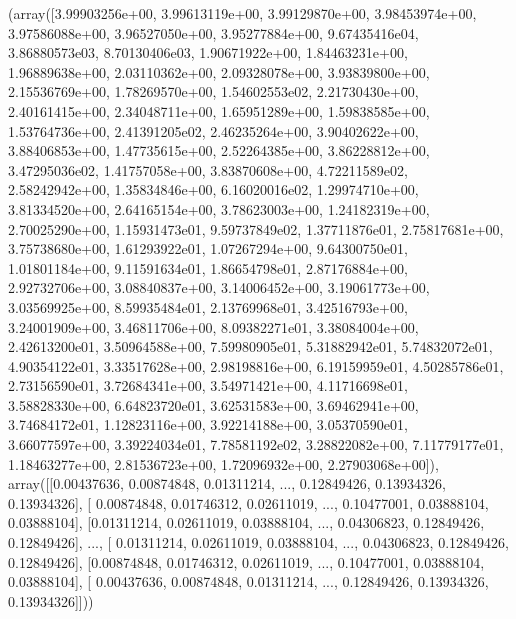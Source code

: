 \documentclass[letterpaper,10pt,english]{jupyterBook}
\begin{document}
\begin{sphinxVerbatim}[commandchars=\\\{\}]
(array([3.99903256e+00, 3.99613119e+00, 3.99129870e+00, 3.98453974e+00,
        3.97586088e+00, 3.96527050e+00, 3.95277884e+00, 9.67435416e\PYGZhy{}04,
        3.86880573e\PYGZhy{}03, 8.70130406e\PYGZhy{}03, 1.90671922e+00, 1.84463231e+00,
        1.96889638e+00, 2.03110362e+00, 2.09328078e+00, 3.93839800e+00,
        2.15536769e+00, 1.78269570e+00, 1.54602553e\PYGZhy{}02, 2.21730430e+00,
        2.40161415e+00, 2.34048711e+00, 1.65951289e+00, 1.59838585e+00,
        1.53764736e+00, 2.41391205e\PYGZhy{}02, 2.46235264e+00, 3.90402622e+00,
        3.88406853e+00, 1.47735615e+00, 2.52264385e+00, 3.86228812e+00,
        3.47295036e\PYGZhy{}02, 1.41757058e+00, 3.83870608e+00, 4.72211589e\PYGZhy{}02,
        2.58242942e+00, 1.35834846e+00, 6.16020016e\PYGZhy{}02, 1.29974710e+00,
        3.81334520e+00, 2.64165154e+00, 3.78623003e+00, 1.24182319e+00,
        2.70025290e+00, 1.15931473e\PYGZhy{}01, 9.59737849e\PYGZhy{}02, 1.37711876e\PYGZhy{}01,
        2.75817681e+00, 3.75738680e+00, 1.61293922e\PYGZhy{}01, 1.07267294e+00,
        9.64300750e\PYGZhy{}01, 1.01801184e+00, 9.11591634e\PYGZhy{}01, 1.86654798e\PYGZhy{}01,
        2.87176884e+00, 2.92732706e+00, 3.08840837e+00, 3.14006452e+00,
        3.19061773e+00, 3.03569925e+00, 8.59935484e\PYGZhy{}01, 2.13769968e\PYGZhy{}01,
        3.42516793e+00, 3.24001909e+00, 3.46811706e+00, 8.09382271e\PYGZhy{}01,
        3.38084004e+00, 2.42613200e\PYGZhy{}01, 3.50964588e+00, 7.59980905e\PYGZhy{}01,
        5.31882942e\PYGZhy{}01, 5.74832072e\PYGZhy{}01, 4.90354122e\PYGZhy{}01, 3.33517628e+00,
        2.98198816e+00, 6.19159959e\PYGZhy{}01, 4.50285786e\PYGZhy{}01, 2.73156590e\PYGZhy{}01,
        3.72684341e+00, 3.54971421e+00, 4.11716698e\PYGZhy{}01, 3.58828330e+00,
        6.64823720e\PYGZhy{}01, 3.62531583e+00, 3.69462941e+00, 3.74684172e\PYGZhy{}01,
        1.12823116e+00, 3.92214188e+00, 3.05370590e\PYGZhy{}01, 3.66077597e+00,
        3.39224034e\PYGZhy{}01, 7.78581192e\PYGZhy{}02, 3.28822082e+00, 7.11779177e\PYGZhy{}01,
        1.18463277e+00, 2.81536723e+00, 1.72096932e+00, 2.27903068e+00]),
 array([[\PYGZhy{}0.00437636,  0.00874848, \PYGZhy{}0.01311214, ...,  0.12849426,
          0.13934326, \PYGZhy{}0.13934326],
        [ 0.00874848, \PYGZhy{}0.01746312,  0.02611019, ..., \PYGZhy{}0.10477001,
          0.03888104,  0.03888104],
        [\PYGZhy{}0.01311214,  0.02611019, \PYGZhy{}0.03888104, ..., \PYGZhy{}0.04306823,
         \PYGZhy{}0.12849426,  0.12849426],
        ...,
        [ 0.01311214,  0.02611019,  0.03888104, ...,  0.04306823,
          0.12849426,  0.12849426],
        [\PYGZhy{}0.00874848, \PYGZhy{}0.01746312, \PYGZhy{}0.02611019, ...,  0.10477001,
         \PYGZhy{}0.03888104,  0.03888104],
        [ 0.00437636,  0.00874848,  0.01311214, ..., \PYGZhy{}0.12849426,
         \PYGZhy{}0.13934326, \PYGZhy{}0.13934326]]))
\end{sphinxVerbatim}
\end{document}
